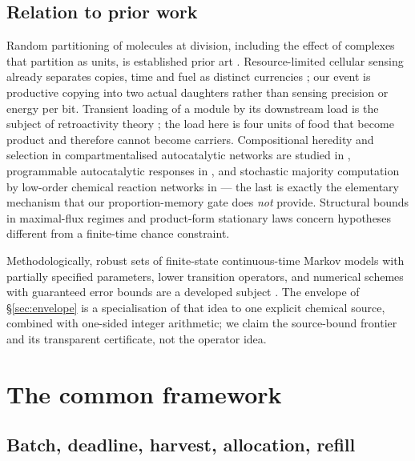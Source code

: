 \documentclass[11pt]{article}
\theoremstyle{plain}
\theoremstyle{definition}
\theoremstyle{remark}
\begin{document}
\subsection{Relation to prior work}\label{sec:prior}

Random partitioning of molecules at division, including the effect of
complexes that partition as units, is established prior art \cite{huh2011}.
Resource-limited cellular sensing already separates copies, time and fuel as
distinct currencies \cite{govern2014}; our event is productive copying into
two actual daughters rather than sensing precision or energy per bit.
Transient loading of a module by its downstream load is the subject of
retroactivity theory \cite{delvecchio2008}; the load here is four units of
food that become product and therefore cannot become carriers. Compositional
heredity and selection in compartmentalised autocatalytic networks are studied
in \cite{segre2000,matsubara2026}, programmable autocatalytic responses in
\cite{kriukov2024}, and stochastic majority computation by low-order chemical
reaction networks in \cite{condon2020} --- the last is exactly the elementary
mechanism that our proportion-memory gate does \emph{not} provide. Structural
bounds in maximal-flux regimes \cite{despons2023} and product-form stationary
laws \cite{anderson2010} concern hypotheses different from a finite-time
chance constraint.

Methodologically, robust sets of finite-state continuous-time Markov models
with partially specified parameters, lower transition operators, and numerical
schemes with guaranteed error bounds are a developed subject
\cite{krak2017,erreygers2017}. The envelope of \S\ref{sec:envelope} is a
specialisation of that idea to one explicit chemical source, combined with
one-sided integer arithmetic; we claim the source-bound frontier and its
transparent certificate, not the operator idea.

\section{The common framework}\label{sec:framework}

\subsection{Batch, deadline, harvest, allocation, refill}
\end{document}
